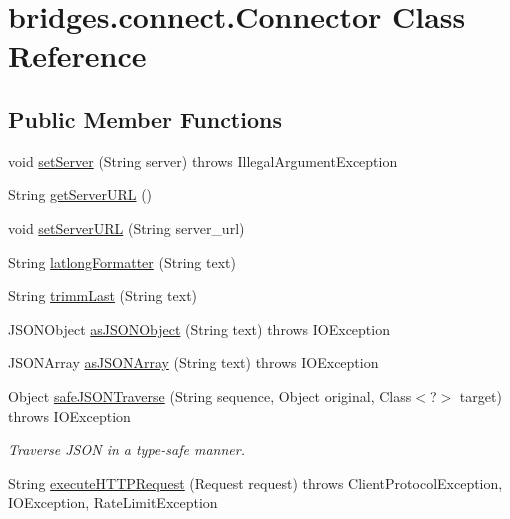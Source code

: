 \hypertarget{classbridges_1_1connect_1_1_connector}{}\section{bridges.\+connect.\+Connector Class Reference}
\label{classbridges_1_1connect_1_1_connector}
\subsection*{Public Member Functions}
\begin{DoxyCompactItemize}
\item 
void \hyperlink{classbridges_1_1connect_1_1_connector_acab24a8c4ffd3349ec67536552fb30b3}{set\+Server} (String server)  throws Illegal\+Argument\+Exception 
\item 
String \hyperlink{classbridges_1_1connect_1_1_connector_a0b9809180aac96a83e31e224ab5ed6ec}{get\+Server\+U\+RL} ()
\item 
void \hyperlink{classbridges_1_1connect_1_1_connector_a71f449c91e529f79730df27e01fdf674}{set\+Server\+U\+RL} (String server\+\_\+url)
\item 
String \hyperlink{classbridges_1_1connect_1_1_connector_a2318cd93d18ef58285598f6f9cdf727b}{latlong\+Formatter} (String text)
\item 
String \hyperlink{classbridges_1_1connect_1_1_connector_ac0dca0bd99b6abbbd8a77874a95e6d49}{trimm\+Last} (String text)
\item 
J\+S\+O\+N\+Object \hyperlink{classbridges_1_1connect_1_1_connector_aac3fb75dd7975c4439cfd1bf6cefe0a6}{as\+J\+S\+O\+N\+Object} (String text)  throws I\+O\+Exception 
\item 
J\+S\+O\+N\+Array \hyperlink{classbridges_1_1connect_1_1_connector_aa5bd647713545fa24c6d730eacb6bc54}{as\+J\+S\+O\+N\+Array} (String text)  throws I\+O\+Exception 
\item 
Object \hyperlink{classbridges_1_1connect_1_1_connector_ab7d1d242fbf9acade316650e54a3d020}{safe\+J\+S\+O\+N\+Traverse} (String sequence, Object original, Class$<$?$>$ target)  throws I\+O\+Exception 
\begin{DoxyCompactList}\small\item\em Traverse J\+S\+ON in a type-\/safe manner. \end{DoxyCompactList}\item 
String \hyperlink{classbridges_1_1connect_1_1_connector_aabcfde23d155c8c42edb8a1407320bc5}{execute\+H\+T\+T\+P\+Request} (Request request)  throws Client\+Protocol\+Exception, I\+O\+Exception, Rate\+Limit\+Exception 

\end{DoxyCompactItemize}
